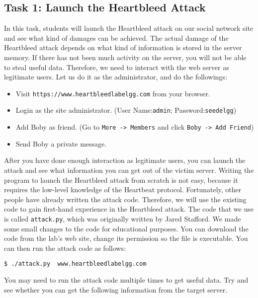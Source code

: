 \subsection{Task 1: Launch the Heartbleed Attack}

In this task, students will launch the Heartbleed attack on 
our social network site and see what kind of damages can be achieved. 
The actual damage of the Heartbleed attack depends on what kind of
information is stored in the server memory. If there has not been much
activity on the server, you will not be able to steal useful data.
Therefore, we need to interact with the web server as legitimate users. Let us
do it as the administrator, and do the followings:
	  
  \begin{itemize} 
  \item Visit \texttt{https://www.heartbleedlabelgg.com} from your
        browser. 
  \item Login as the site administrator. (User Name:\texttt{admin}; Password:\texttt{seedelgg})
  \item Add Boby as friend. (Go to \texttt{More -> Members} and
	  click  \texttt{Boby -> Add Friend})
  \item Send Boby a private message.
  \end{itemize} 
	    

After you have done enough interaction as legitimate users, you can launch
the attack and see what information you can get out of the victim server. 
Writing the program to launch the Heartbleed attack from scratch is not
easy, because it requires the low-level knowledge of the Heartbeat
protocol. Fortunately, other people have already written the
attack code. Therefore, we will use the existing code to gain
first-hand experience in the Heartbleed attack.
The code that we use is called \texttt{attack.py},
which was originally written by Jared Stafford.
We made some small changes to the code for educational purposes.
You can download the code from the lab's web site, change its permission so
the file is executable. You can then run the attack code as follows:

\begin{lstlisting}
$ ./attack.py  www.heartbleedlabelgg.com
\end{lstlisting}
	   
You may need to run the attack code multiple times to get useful data. 
Try and see whether you can get the following information from the target
server. 

